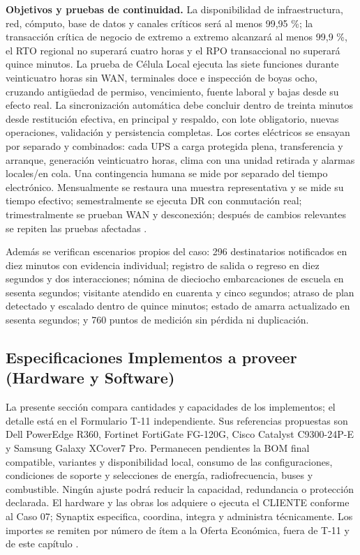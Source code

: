 \textbf{Objetivos y pruebas de continuidad.} La disponibilidad de infraestructura, red, cómputo, base de datos y canales críticos será al menos 99,95 \%; la transacción crítica de negocio de extremo a extremo alcanzará al menos 99,9 \%, el RTO regional no superará cuatro horas y el RPO transaccional no superará quince minutos. La prueba de Célula Local ejecuta las siete funciones durante veinticuatro horas sin WAN, terminales doce e inspección de boyas ocho, cruzando antigüedad de permiso, vencimiento, fuente laboral y bajas desde su efecto real. La sincronización automática debe concluir dentro de treinta minutos desde restitución efectiva, en principal y respaldo, con lote obligatorio, nuevas operaciones, validación y persistencia completas. Los cortes eléctricos se ensayan por separado y combinados: cada UPS a carga protegida plena, transferencia y arranque, generación veinticuatro horas, clima con una unidad retirada y alarmas locales/en cola. Una contingencia humana se mide por separado del tiempo electrónico. Mensualmente se restaura una muestra representativa y se mide su tiempo efectivo; semestralmente se ejecuta DR con conmutación real; trimestralmente se prueban WAN y desconexión; después de cambios relevantes se repiten las pruebas afectadas \parencites[RT-06.07/08/13, p.~15; RT-12.10, p.~26]{pucv-transversal}[cap.~15, RT-03.10/13]{caso07}.

Además se verifican escenarios propios del caso: 296 destinatarios notificados en diez minutos con evidencia individual; registro de salida o regreso en diez segundos y dos interacciones; nómina de dieciocho embarcaciones de escuela en sesenta segundos; visitante atendido en cuarenta y cinco segundos; atraso de plan detectado y escalado dentro de quince minutos; estado de amarra actualizado en sesenta segundos; y 760 puntos de medición sin pérdida ni duplicación.

\subsection{Especificaciones Implementos a proveer (Hardware y Software)}

La presente sección compara cantidades y capacidades de los implementos; el detalle está en el Formulario T-11 independiente. Sus referencias propuestas son Dell PowerEdge R360, Fortinet FortiGate FG-120G, Cisco Catalyst C9300-24P-E y Samsung Galaxy XCover7 Pro. Permanecen pendientes la BOM final compatible, variantes y disponibilidad local, consumo de las configuraciones, condiciones de soporte y selecciones de energía, radiofrecuencia, buses y combustible. Ningún ajuste podrá reducir la capacidad, redundancia o protección declarada. El hardware y las obras los adquiere o ejecuta el CLIENTE conforme al Caso 07; Synaptix especifica, coordina, integra y administra técnicamente. Los importes se remiten por número de ítem a la Oferta Económica, fuera de T-11 y de este capítulo \parencites[art.~14.2, p.~10; art.~50.2, p.~29]{pucv-admin}[cap.~11]{caso07}.

